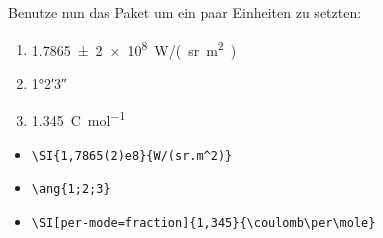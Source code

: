 \item Benutze nun das Paket  um ein paar Einheiten zu setzten:\label{siunitx}
\begin{enumerate}
    \item \SI{1,7865(2)e8}{W/(sr.m^2)}
    \item \ang{1;2;3}
    \item \SI[per-mode=fraction]{1,345}{\coulomb\per\mole}
\end{enumerate}
\begin{loesung}
    \begin{itemize}
        \item \verb|\SI{1,7865(2)e8}{W/(sr.m^2)}|
        \item \verb|\ang{1;2;3}|
        \item \verb|\SI[per-mode=fraction]{1,345}{\coulomb\per\mole}|
    \end{itemize}
\end{loesung}